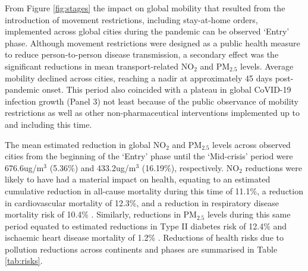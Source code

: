 \documentclass[preprint,12pt]{elsarticle}
\begin{document}
From Figure \ref{fig:stages} the impact on global mobility that resulted from the introduction of movement restrictions, including stay-at-home orders, implemented across global cities during the pandemic can be observed `Entry' phase\cite{hale2021global}. Although movement restrictions were designed as a public health measure to reduce person-to-person disease transmission, a secondary effect was the significant reductions in mean transport-related NO$_{2}$ and PM$_{2.5}$ levels\cite{zhang2023impact}. Average mobility declined across cities, reaching a nadir at approximately 45 days post-pandemic onset. This period also coincided with a plateau in global CoVID-19 infection growth (Panel 3) not least because of the public observance of mobility restrictions as well as other non-pharmaceutical interventions implemented up to and including this time\cite{hale2021global}. 

The mean estimated reduction in global NO$_{2}$ and PM$_{2.5}$ levels across observed cities from the beginning of the `Entry' phase until the `Mid-crisis' period were 676.6ug/m$^{3}$ (5.36\%) and 433.2ug/m$^{3}$ (16.19\%), respectively. NO$_{2}$ reductions were likely to have had a material impact on health, equating to an estimated cumulative reduction in all-cause mortality during this time of 11.1\%, a reduction in cardiovascular mortality of 12.3\%, and a reduction in respiratory disease mortality risk of 10.4\% \cite{Huang19Pollution}. Similarly, reductions in PM$_{2.5}$ levels during this same period equated to estimated reductions in Type II diabetes risk of 12.4\% and ischaemic heart disease mortality of 1.2\% \cite{Xie257}.  Reductions of health risks due to pollution reductions across continents and phases are summarised in Table \ref{tab:risks}.
\end{document}
